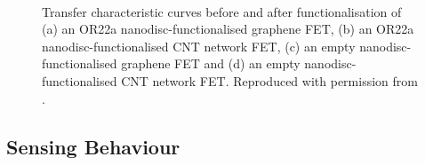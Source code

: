 \documentclass[
  a4paper,
]{scrbook}
\begin{document}
\begin{figure}
\begin{minipage}[t]{0.01\linewidth}
{\centering 

~

}

\end{minipage}%

\caption{\label{fig-functionalisation-literature}Transfer characteristic
curves before and after functionalisation of (a) an OR22a
nanodisc-functionalised graphene FET, (b) an OR22a
nanodisc-functionalised CNT network FET, (c) an empty
nanodisc-functionalised graphene FET and (d) an empty
nanodisc-functionalised CNT network FET. Reproduced with permission from
\autocite{Murugathas2019a,Murugathas2020}.}

\end{figure}

\hypertarget{sensing-behaviour-1}{%
\subsection{Sensing Behaviour}\label{sensing-behaviour-1}}
\end{document}
